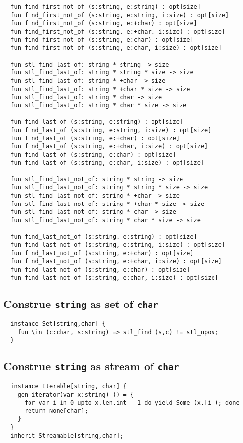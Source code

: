 \documentclass[oneside]{book}
\begin{document}
\begin{verbatim}
  fun find_first_not_of (s:string, e:string) : opt[size]
  fun find_first_not_of (s:string, e:string, i:size) : opt[size]
  fun find_first_not_of (s:string, e:+char) : opt[size]
  fun find_first_not_of (s:string, e:+char, i:size) : opt[size]
  fun find_first_not_of (s:string, e:char) : opt[size]
  fun find_first_not_of (s:string, e:char, i:size) : opt[size]

  fun stl_find_last_of: string * string -> size
  fun stl_find_last_of: string * string * size -> size
  fun stl_find_last_of: string * +char -> size
  fun stl_find_last_of: string * +char * size -> size
  fun stl_find_last_of: string * char -> size
  fun stl_find_last_of: string * char * size -> size

  fun find_last_of (s:string, e:string) : opt[size]
  fun find_last_of (s:string, e:string, i:size) : opt[size]
  fun find_last_of (s:string, e:+char) : opt[size]
  fun find_last_of (s:string, e:+char, i:size) : opt[size]
  fun find_last_of (s:string, e:char) : opt[size]
  fun find_last_of (s:string, e:char, i:size) : opt[size]

  fun stl_find_last_not_of: string * string -> size
  fun stl_find_last_not_of: string * string * size -> size
  fun stl_find_last_not_of: string * +char -> size
  fun stl_find_last_not_of: string * +char * size -> size
  fun stl_find_last_not_of: string * char -> size
  fun stl_find_last_not_of: string * char * size -> size

  fun find_last_not_of (s:string, e:string) : opt[size]
  fun find_last_not_of (s:string, e:string, i:size) : opt[size]
  fun find_last_not_of (s:string, e:+char) : opt[size]
  fun find_last_not_of (s:string, e:+char, i:size) : opt[size]
  fun find_last_not_of (s:string, e:char) : opt[size]
  fun find_last_not_of (s:string, e:char, i:size) : opt[size]
\end{verbatim}

  
\subsection{Construe {\tt string} as set of {\tt char}}
\begin{verbatim}
  instance Set[string,char] {
    fun \in (c:char, s:string) => stl_find (s,c) != stl_npos;
  }
\end{verbatim}
  
\subsection{Construe {\tt string} as stream of {\tt char}}
\begin{verbatim}
  instance Iterable[string, char] {
    gen iterator(var x:string) () = {
      for var i in 0 upto x.len.int - 1 do yield Some (x.[i]); done
      return None[char];
    }
  }
  inherit Streamable[string,char];
\end{verbatim}
\end{document}
